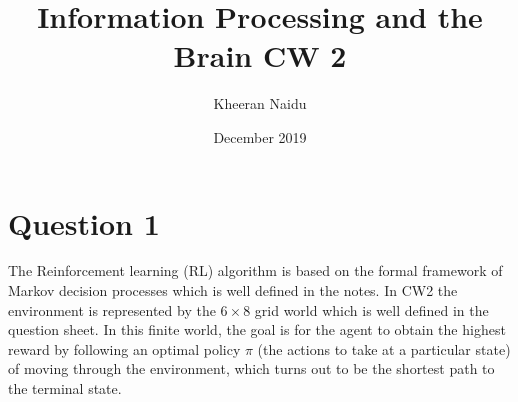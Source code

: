 \documentclass[10pt, a4paper]{article}
\title{Information Processing and the Brain CW 2}
\author{Kheeran Naidu}
\date{December 2019}
\begin{document}
\maketitle


\section*{Question 1}
The Reinforcement learning (RL) algorithm is based on the formal framework of Markov decision processes which is well defined in the notes.
In CW2 the environment is represented by the $6 \times 8$ grid world which is well defined in the question sheet. In this finite world, the goal is for the agent to obtain the highest reward by following an optimal policy $\pi$ (the actions to take at a particular state) of moving through the environment, which turns out to be the shortest path to the terminal state.
\end{document}
